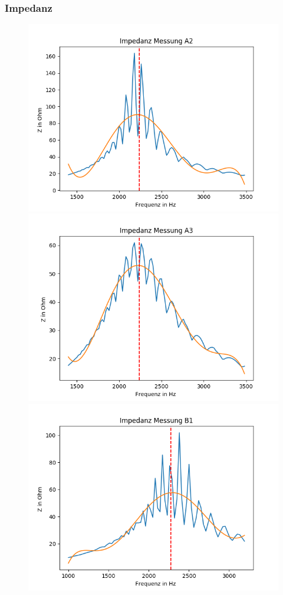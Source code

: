 \documentclass[12pt,a4paper]{article}
\begin{document}
\subsubsection{Impedanz}
\begin{figure}[H]
\centering
\includegraphics[scale=0.69]{Bilder/Parallel_Impedanz_2.png}
\includegraphics[scale=0.69]{Bilder/Parallel_Impedanz_3.png}
\includegraphics[scale=0.69]{Bilder/Parallel_ImpedanzB_2.png}
\end{figure}
\end{document}
